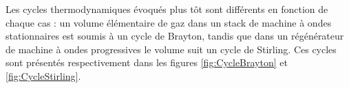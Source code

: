 %    	
%	    

Les cycles thermodynamiques évoqués plus tôt sont différents en fonction de chaque cas : un volume élémentaire de gaz dans un stack de machine à ondes stationnaires est soumis à un cycle de Brayton, tandis que dans un régénérateur de machine à ondes progressives le volume suit un cycle de Stirling. Ces cycles sont présentés respectivement dans les figures \ref{fig:CycleBrayton} et \ref{fig:CycleStirling}.

